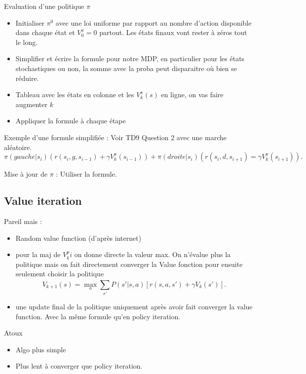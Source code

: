 \documentclass{article}
\theoremstyle{plain}%
\theoremstyle{definition}
\theoremstyle{remark}
\begin{document}
Evaluation d'une politique $ \pi $ 
\begin{itemize}
    \item Initialiser $ \pi ^0 $ avec une loi uniforme par rapport au nombre d'action disponible dans chaque état et $ V^\pi _0 = 0 $ partout. Les états finaux vont rester à zéros tout le long.
    \item Simplifier et écrire la formule pour notre MDP, en particulier pour les états stochastiques ou non, la somme avec la proba peut disparaitre où bien se réduire.
    \item Tableau avec les états en colonne et les $ V^\pi_k (s) $ en ligne, on vas faire augmenter $ k $ 
    \item Appliquer la formule à chaque étape
\end{itemize}
Exemple d'une formule simplifiée : Voir TD9 Question 2 avec une marche aléatoire. 
\[
    \pi (gauche | s_i) (r(s_i, g, s_{i-1}) + \gamma V_k^\pi (s_{i-1})) + \pi (droite | s_i) (r(s_i, d, s_{i+1}) = \gamma V_k^\pi (s_{i+1}))
.\]

Mise à jour de $ \pi $ : Utiliser la formule.

\subsection{Value iteration}
Pareil mais :\begin{itemize}
    \item Random value function (d'après internet)
    \item pour la maj de $ V_k^pi $ on donne directe la valeur max. On n'évalue plus la politique mais on fait directement converger la Value fonction pour ensuite seulement choisir la politique
    \[
        V_{k+1}(s) = \max _a \sum_{s'}^{}P(s'|s, a)[r(s,a,s') + \gamma V_k (s')]
    .\]
    \item une update final de la politique uniquement après avoir fait converger la value function. Avec la même formule qu'en policy iteration.
\end{itemize}
Atoux \begin{itemize}
    \item Algo plus simple
    \item Plus lent à converger que policy iteration.
\end{itemize}
\end{document}
